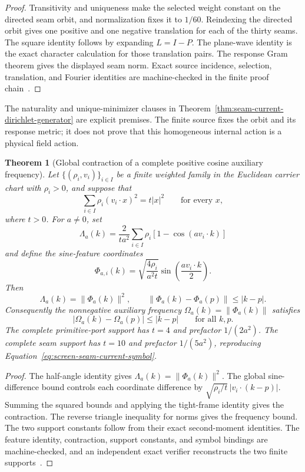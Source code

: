 \documentclass[11pt]{article}
\newtheorem{theorem}{Theorem}[section]
\theoremstyle{remark}
\theoremstyle{plain}
\begin{document}
\begin{proof}
Transitivity and uniqueness make the selected weight constant on the directed
seam orbit, and normalization fixes it to \(1/60\). Reindexing the directed
orbit gives one positive and one negative translation for each of the thirty
seams. The square identity follows by expanding \(L=I-P\). The plane-wave
identity is the exact character calculation for those translation pairs.
The response Gram theorem gives the displayed seam norm. Exact source
incidence, selection, translation, and Fourier identities are machine-checked
in the finite proof chain~\cite{ophrepo}.
\end{proof}

The naturality and unique-minimizer clauses in
Theorem~\ref{thm:seam-current-dirichlet-generator} are explicit premises.
The finite source fixes the orbit and its response metric; it does not prove
that this homogeneous internal action is a physical field action.

\begin{theorem}[Global contraction of a complete positive cosine auxiliary frequency]
\label{thm:positive-cosine-frequency-contraction}
Let \(\{(\rho_i,v_i)\}_{i\in I}\) be a finite weighted family in the
Euclidean carrier chart with \(\rho_i>0\), and suppose that
\[
\sum_{i\in I}\rho_i(v_i\mathbin{\cdot}x)^2=t|x|^2
\qquad\text{for every }x,
\]
where \(t>0\). For \(a\ne0\), set
\[
\Lambda_a(k)=\frac{2}{ta^2}\sum_{i\in I}\rho_i
 [1-\cos(av_i\mathbin{\cdot}k)]
\]
and define the sine-feature coordinates
\[
\Phi_{a,i}(k)=
 \sqrt{\frac{4\rho_i}{a^2t}}
 \sin\!\left(\frac{av_i\mathbin{\cdot}k}{2}\right).
\]
Then
\[
\Lambda_a(k)=\|\Phi_a(k)\|^2,
\qquad
\|\Phi_a(k)-\Phi_a(p)\|\le |k-p|.
\]
Consequently the nonnegative auxiliary frequency
\(\Omega_a(k)=\|\Phi_a(k)\|\) satisfies
\[
|\Omega_a(k)-\Omega_a(p)|\le |k-p|
\qquad\text{for all }k,p.
\]
The complete primitive-port support has \(t=4\) and prefactor
\(1/(2a^2)\). The complete seam support has \(t=10\) and prefactor
\(1/(5a^2)\), reproducing
Equation~\eqref{eq:screen-seam-current-symbol}.
\end{theorem}

\begin{proof}
The half-angle identity gives
\(\Lambda_a(k)=\|\Phi_a(k)\|^2\). The global sine-difference bound controls
each coordinate difference by
\(\sqrt{\rho_i/t}\,|v_i\mathbin{\cdot}(k-p)|\). Summing the squared bounds
and applying the tight-frame identity gives the contraction. The reverse
triangle inequality for norms gives the frequency bound. The two support
constants follow from their exact second-moment identities. The feature
identity, contraction, support constants, and symbol bindings are
machine-checked, and an independent exact verifier reconstructs the two
finite supports~\cite{ophrepo}.
\end{proof}
\end{document}
